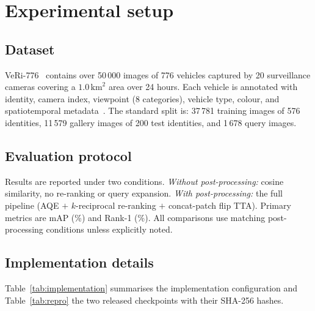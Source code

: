 \documentclass[10pt,a4paper]{article}
\begin{document}
\section{Experimental setup}
\label{sec:setup}

\subsection{Dataset}
VeRi-776~\cite{liu2016veri,liu2018provid} contains over 50\,000 images of 776
vehicles captured by 20 surveillance cameras covering a
$1.0\,\text{km}^{2}$ area over 24 hours. Each vehicle is annotated with
identity, camera index, viewpoint (8 categories), vehicle type, colour, and
spatiotemporal metadata~\cite{liu2018provid}. The standard split is: 37\,781
training images of 576 identities, 11\,579 gallery images of 200 test
identities, and 1\,678 query images.

\subsection{Evaluation protocol}
Results are reported under two conditions. \emph{Without post-processing:}
cosine similarity, no re-ranking or query expansion. \emph{With
post-processing:} the full pipeline (AQE $+$ $k$-reciprocal re-ranking $+$
concat-patch flip TTA). Primary metrics are mAP (\%) and Rank-1 (\%). All
comparisons use matching post-processing conditions unless explicitly noted.

\subsection{Implementation details}
Table~\ref{tab:implementation} summarises the implementation configuration and
Table~\ref{tab:repro} the two released checkpoints with their SHA-256 hashes.
\end{document}
